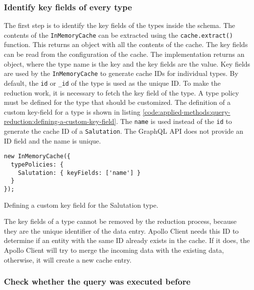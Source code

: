 \subsubsection{Identify key fields of every type}

The first step is to identify the key fields of the types inside the schema. The contents of the \texttt{InMemoryCache} can be extracted using the \texttt{cache.extract()} function. This returns an object with all the contents of the cache. The key fields can be read from the configuration of the cache. The implementation returns an object, where the type name is the key and the key fields are the value. Key fields are used by the \texttt{InMemoryCache} to generate cache \acp{ID} for individual types. By default, the \texttt{id} or \texttt{\_id} of the type is used as the unique \ac{ID}. To make the reduction work, it is necessary to fetch the key field of the type. A type policy must be defined for the type that should be customized. The definition of a custom key-field for a type is shown in listing \ref{code:applied-methods:query-reduction:defining-a-custom-key-field}. The \texttt{name} is used instead of the \texttt{id} to generate the cache \ac{ID} of a \texttt{Salutation}. The GraphQL API does not provide an \ac{ID} field and the name is unique. \cite{misc:-:background:graphql:apollo-client-cache-configuration}

\ifshowListings
\begin{listing}[H]
\begin{verbatim}
new InMemoryCache({
  typePolicies: {
    Salutation: { keyFields: ['name'] }
  }
});
\end{verbatim}
\caption{Defining a custom key field for the Salutation type.}\label{code:applied-methods:query-reduction:defining-a-custom-key-field}
\end{listing}
\fi

\noindent The key fields of a type cannot be removed by the reduction process, because they are the unique identifier of the data entry. Apollo Client needs this \ac{ID} to determine if an entity with the same \ac{ID} already exists in the cache. If it does, the Apollo Client will try to merge the incoming data with the existing data, otherwise, it will create a new cache entry.

\subsubsection{Check whether the query was executed before}

